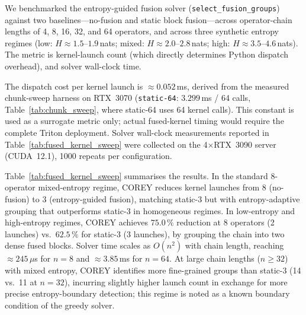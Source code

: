 We benchmarked the entropy-guided fusion solver (\texttt{select\_fusion\_groups})
against two baselines---no-fusion and static block fusion---across operator-chain
lengths of 4, 8, 16, 32, and 64 operators, and across three synthetic entropy
regimes (low: $H\approx1.5$--$1.9$\,nats; mixed: $H\approx2.0$--$2.8$\,nats;
high: $H\approx3.5$--$4.6$\,nats).  The metric is kernel-launch count (which
directly determines Python dispatch overhead), and solver wall-clock time.

The dispatch cost per kernel launch is $\approx0.052$\,ms, derived from the measured
chunk-sweep harness on RTX~3070 (\texttt{static-64}: $3.299$\,ms / 64 calls,
Table~\ref{tab:chunk_sweep}, where static-64 uses 64 kernel calls).  This constant is used as a surrogate metric only;
actual fused-kernel timing would require the complete Triton deployment.
Solver wall-clock measurements reported in Table~\ref{tab:fused_kernel_sweep}
were collected on the 4$\times$RTX~3090 server (CUDA~12.1), 1000 repeats per
configuration.

Table~\ref{tab:fused_kernel_sweep} summarises the results.  In the standard
8-operator mixed-entropy regime, COREY reduces kernel launches from 8 (no-fusion)
to 3 (entropy-guided fusion), matching static-3 but with entropy-adaptive grouping
that outperforms static-3 in homogeneous regimes.  In low-entropy and high-entropy
regimes, COREY achieves $75.0\,\%$ reduction at 8 operators (2 launches) vs.\
$62.5\,\%$ for static-3 (3 launches), by grouping the chain into two dense fused
blocks.  Solver time scales as $O(n^2)$ with chain length, reaching $\approx245\,\mu$s for
$n{=}8$ and $\approx3.85$\,ms for $n{=}64$.  At large chain lengths ($n\geq32$)
with mixed entropy, COREY identifies more fine-grained groups than static-3 (14
vs.\ 11 at $n{=}32$), incurring slightly higher launch count in exchange for
more precise entropy-boundary detection; this regime is noted as a known
boundary condition of the greedy solver.


